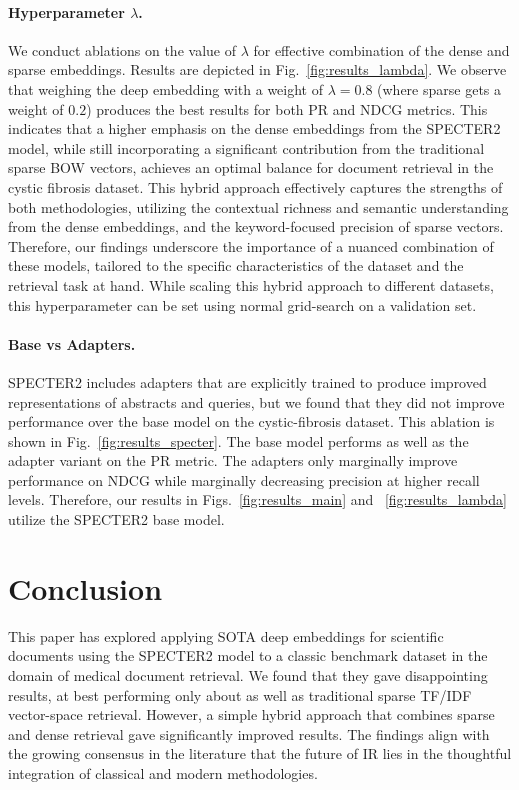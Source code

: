 \documentclass[
]{ceurart}
\begin{document}
\paragraph{Hyperparameter $\lambda$.}
We conduct ablations on the value of $\lambda$ for effective combination of the dense and sparse embeddings. 
Results are depicted in Fig.~\ref{fig:results_lambda}. We observe that weighing the deep embedding with a weight of $\lambda=0.8$ (where sparse gets a weight of $0.2$) produces the best results for both PR and NDCG metrics. 
This indicates that a higher emphasis on the dense embeddings from the SPECTER2 model, while still incorporating a significant contribution from the traditional sparse BOW vectors, achieves an optimal balance for document retrieval in the cystic fibrosis dataset. This hybrid approach effectively captures the strengths of both methodologies, utilizing the contextual richness and semantic understanding from the dense embeddings, and the keyword-focused precision of sparse vectors. Therefore, our findings underscore the importance of a nuanced combination of these models, tailored to the specific characteristics of the dataset and the retrieval task at hand. While scaling this hybrid approach to different datasets, this hyperparameter can be set using normal grid-search on a validation set.



\paragraph{Base vs Adapters.}
SPECTER2 includes adapters that are explicitly trained to produce improved representations of abstracts and queries, but we found that they did not improve performance over the base model on the cystic-fibrosis dataset. This ablation is shown in Fig.~\ref{fig:results_specter}. The base model performs as well as the adapter variant on the PR metric. The adapters only marginally improve performance on NDCG while marginally decreasing  precision at higher recall levels. Therefore, our results in Figs.~\ref{fig:results_main} and ~\ref{fig:results_lambda} utilize the SPECTER2 base model.



\section{Conclusion}

This paper has explored applying SOTA deep embeddings for scientific documents using the SPECTER2 model to a classic benchmark dataset in the domain of medical document retrieval.  We found that they gave disappointing results, at best performing only about as well as traditional sparse TF/IDF vector-space retrieval. However, a simple hybrid approach that combines sparse and dense retrieval gave significantly improved results.  
The findings align with the growing consensus in the literature that the future of IR lies in the thoughtful integration of classical and modern methodologies.




\appendix
\end{document}
